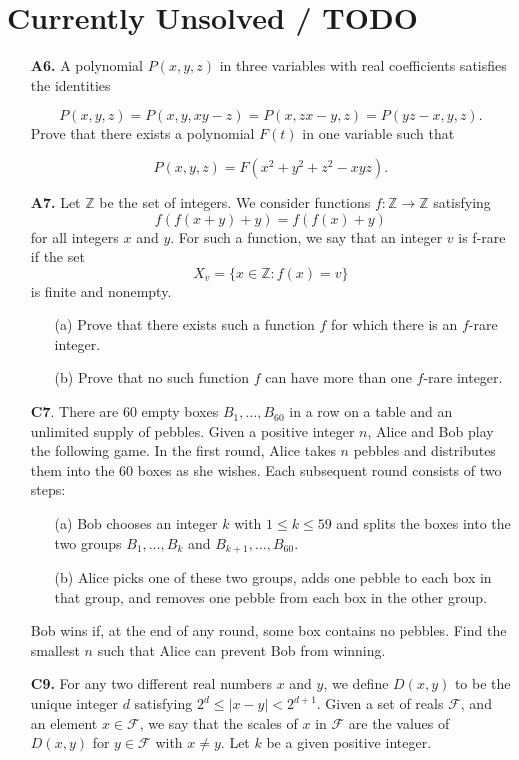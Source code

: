 \documentclass[11pt,a4paper]{article}
\begin{document}
\section*{Currently Unsolved / TODO}
\begin{enumerate}
	\item [\textbf{A6.}] A polynomial $P(x, y, z)$ in three variables with real coefficients satisfies the identities
	
	$$P(x, y, z)=P(x, y, xy-z)=P(x, zx-y, z)=P(yz-x, y, z).$$
	Prove that there exists a polynomial $F(t)$ in one variable such that
	
	$$P(x,y,z)=F(x^2+y^2+z^2-xyz).$$
	
	\item [\textbf{A7.}] Let $\mathbb Z$ be the set of integers. We consider functions $f :\mathbb Z\to\mathbb Z$ satisfying
	\[f\left(f(x+y)+y\right)=f\left(f(x)+y\right)\]for all integers $x$ and $y$. For such a function, we say that an integer $v$ is f-rare if the set
	\[X_v=\{x\in\mathbb Z:f(x)=v\}\]is finite and nonempty.
	\begin{enumerate}
		\item [(a)] Prove that there exists such a function $f$ for which there is an $f$-rare integer.
		\item [(b)] Prove that no such function $f$ can have more than one $f$-rare integer.
	\end{enumerate}
	
	\item [\textbf{C7}.] There are 60 empty boxes $B_1,\ldots,B_{60}$ in a row on a table and an unlimited supply of pebbles. Given a positive integer $n$, Alice and Bob play the following game.
	In the first round, Alice takes $n$ pebbles and distributes them into the 60 boxes as she wishes. Each subsequent round consists of two steps:
	\begin{enumerate}
		\item[(a)] Bob chooses an integer $k$ with $1\leq k\leq 59$ and splits the boxes into the two groups $B_1,\ldots,B_k$ and $B_{k+1},\ldots,B_{60}$.
		\item[(b)] Alice picks one of these two groups, adds one pebble to each box in that group, and removes one pebble from each box in the other group.
	\end{enumerate}
	Bob wins if, at the end of any round, some box contains no pebbles. Find the smallest $n$ such that Alice can prevent Bob from winning.
	
	\item [\textbf{C9.}] For any two different real numbers $x$ and $y$, we define $D(x,y)$ to be the unique integer $d$ satisfying $2^d\le |x-y| < 2^{d+1}$. Given a set of reals $\mathcal F$, and an element $x\in \mathcal F$, we say that the scales of $x$ in $\mathcal F$ are the values of $D(x,y)$ for $y\in\mathcal F$ with $x\neq y$. Let $k$ be a given positive integer.
	

\end{enumerate}
\end{document}
